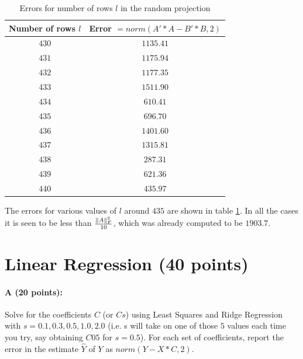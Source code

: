 \documentclass[11pt]{article}
\begin{document}
\begin{table}[!h] 
    \centering
    \caption{Errors for number of rows $l$ in the random projection}
    \label{ErrRandProj}
    \begin{tabular}{|c|c|}
      \hline
   Number of rows $l$  & Error $=norm(A'*A - B'*B, 2)$ \\
      \hline      
      $430$ &      $1135.41$  \\
      \hline
      $431$ &      $1175.94$  \\
      \hline
      $432$ &      $1177.35$  \\
      \hline
      $433$ &      $1511.90$  \\
      \hline
      $434$ &      $610.41$  \\
      \hline
      $435$ &      $696.70$  \\
      \hline
      $436$ &      $1401.60$  \\
      \hline
      $437$ &      $1315.81$  \\
      \hline
      $438$ &      $287.31$  \\
      \hline
      $439$ &      $621.36$  \\
      \hline
      $440$ &      $435.97$  \\
      \hline
    \end{tabular}
\end{table}

The errors for various values of $l$ around $435$ are shown in table \ref{ErrRandProj}. In all the cases it is seen to be less than $\frac{\lVert A\rVert_F^2}{10}$, which was already computed to be $1903.7$.

\section{Linear Regression (40 points)}

\paragraph{A (20 points):}
Solve for the coefficients $C$ (or $Cs$) using Least Squares and Ridge Regression with $s = {0.1, 0.3, 0.5, 1.0, 2.0}$ (i.e. s will take on one of those $5$ values each time you try, say obtaining $C05$ for $s = 0.5$). For each set of coefficients, report the error in the estimate $\hat{Y}$ of $Y$ as $norm(Y - X*C,2)$.
\end{document}
